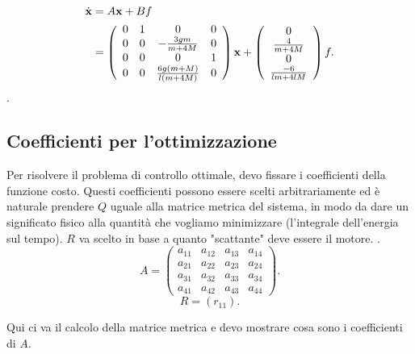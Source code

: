\begin{equation*}
    \begin{aligned}
        \dot {\mathbf{x}} &= A\mathbf{x} + Bf \\
        &= \left(\begin{array}{cccc}0&1&0&0\\0&0&-\frac{3gm}{m+4M}&0\\0&0&0&1\\0&0&\frac{6g(m+M)}{l(m+4M)}&0\\\end{array}\right) \mathbf{x} + \left(\begin{array}{c}0\\\frac{4}{m+4M}\\0\\\frac{-6}{lm+4lM}\end{array}\right)f.
    \end{aligned}
\end{equation*}
.

\subsection{Coefficienti per l'ottimizzazione}
Per risolvere il problema di controllo ottimale, devo fissare i coefficienti della funzione costo.
Questi coefficienti possono essere scelti arbitrariamente ed è naturale prendere $Q$ uguale alla matrice metrica del sistema, in modo da dare un significato fisico alla quantità che vogliamo minimizzare (l'integrale dell'energia sul tempo). $R$ va scelto in base a quanto "scattante" deve essere il motore. .
\begin{equation*}
    A = \left(
    \begin{array}{cccc}
        a_{11} & a_{12} & a_{13} & a_{14} \\
        a_{21} & a_{22} & a_{23} & a_{24} \\
        a_{31} & a_{32} & a_{33} & a_{34} \\
        a_{41} & a_{42} & a_{43} & a_{44}
    \end{array}
    \right).
\end{equation*}
\begin{equation*}
    R = \left(
    r_{11}
    \right).
\end{equation*}

Qui ci va il calcolo della matrice metrica e devo mostrare cosa sono i coefficienti di $A$.


